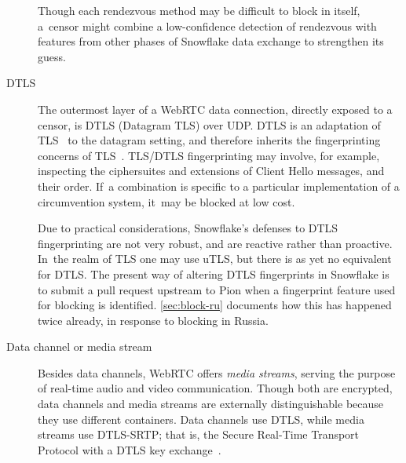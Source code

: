 \documentclass[letterpaper,twocolumn]{article}
\newcommand{\firstterm}[1]{\textit{#1}}
\begin{document}
\begin{description}
Though each rendezvous method may be difficult to block in itself,
a~censor might combine a low-confidence detection of rendezvous
with features from other phases of Snowflake data exchange
to strengthen its guess.

\item[DTLS]
The outermost layer of a WebRTC data connection,
directly exposed to a censor,
is DTLS (Datagram TLS) over UDP.
DTLS is an adaptation of TLS~\cite[\S 1]{rfc9147} to the datagram setting,
and therefore inherits the fingerprinting concerns of TLS~\cite{Frolov2019a}.
TLS/DTLS fingerprinting may involve, for example,
inspecting the ciphersuites and extensions of Client Hello messages,
and their order.
If~a combination
is specific to a particular implementation of a circumvention system,
it~may be blocked at low cost.

Due to practical considerations,
Snowflake's defenses to DTLS fingerprinting are not very robust,
and are reactive rather than proactive.
In~the realm of TLS one may use uTLS,
but there is as yet no equivalent for DTLS.
The present way of altering DTLS fingerprints in Snowflake
is to submit a pull request upstream to Pion
when a fingerprint feature used for blocking is identified.
\autoref{sec:block-ru} documents how this has happened twice already,
in response to blocking in Russia.

%

\item[Data channel or media stream]
Besides data channels, WebRTC offers \firstterm{media streams},
serving the purpose of real-time
audio and video communication.
Though both are encrypted,
data channels and media streams are externally distinguishable
because they use different containers.
Data channels use DTLS,
while media streams use DTLS-SRTP;
that is, the Secure Real-Time Transport Protocol
with a DTLS key exchange~\cite[\S 4.3]{rfc8827}.


\end{description}
\end{document}
